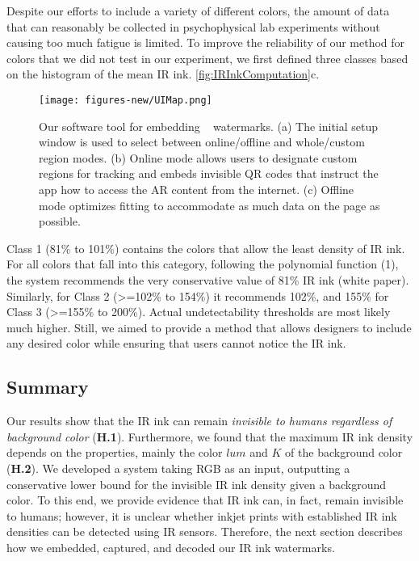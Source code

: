 Despite our efforts to include a variety of different colors, the amount of data that can reasonably be collected in psychophysical lab experiments without causing too much fatigue is limited. To improve the reliability of our method for colors that we did not test in our experiment, we first defined three classes based on the histogram of the mean IR ink.
 \autoref{fig:IRInkComputation}c.


\begin{figure*}[]
  \centering
  \texttt{[image: figures-new/UIMap.png]}
  \caption{Our software tool for embedding \systemName~ watermarks. (a) The initial setup window is used to select between online/offline and whole/custom region modes. (b) Online mode allows users to designate custom regions for tracking and embeds invisible QR codes that instruct the app how to access the AR content from the internet. (c) Offline mode optimizes fitting to accommodate as much data on the page as possible.
 }
  \label{fig:UIexample}
\end{figure*}




 Class 1 (81\% to 101\%) contains the colors that allow the least density of IR ink. For all colors that fall into this category, following the polynomial function (1), the system recommends the very conservative value of 81\% IR ink (white paper). Similarly, for Class 2 (>=102\% to 154\%) it recommends 102\%, and 155\% for Class 3 (>=155\% to 200\%). Actual undetectability thresholds are most likely much higher. Still, we aimed to provide a method that allows designers to include any desired color while ensuring that users cannot notice the IR ink.


\subsection{Summary}
Our results show that the IR ink can remain \textit{invisible to humans regardless of background color} (\textbf{H.1}). Furthermore, we found that the maximum IR ink density depends on the properties, mainly the color $lum$ and $K$ of the background color (\textbf{H.2}). We developed a system taking RGB as an input, outputting a conservative lower bound for the invisible IR ink density given a background color. To this end, we provide evidence that IR ink can, in fact, remain invisible to humans; however, it is unclear whether inkjet prints with established IR ink densities can be detected using IR sensors. Therefore, the next section describes how we embedded, captured, and decoded our IR ink watermarks.







